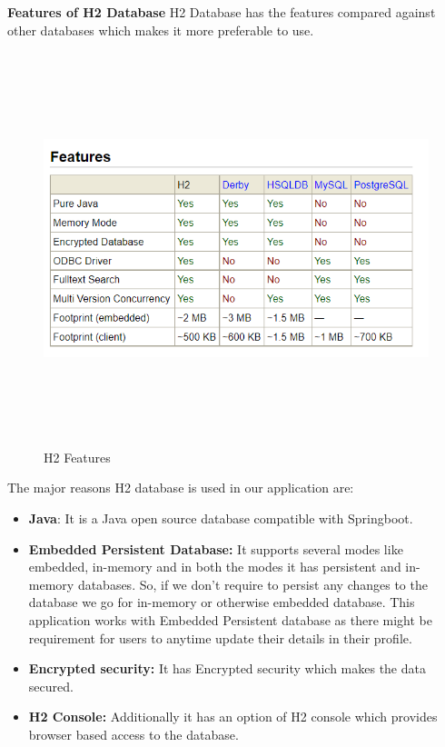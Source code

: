 \begin{enumerate}
    \textbf{Features of H2 Database}\newline
    H2 Database has the features compared against other databases which makes it more preferable to use.
     \begin{figure}[h!]
    \begin{center}
   \includegraphics[scale=0.7,width=7in,height=4.5in]{images/h2features.PNG}
   \centering \caption{H2 Features}
    \end{center}
    \end{figure}
    The major reasons H2 database is used in our application are:
    \begin{itemize}
        \item \textbf{Java}: It is a Java open source database compatible with Springboot.
        \item \textbf{Embedded Persistent Database:} It supports several modes like embedded, in-memory and in both the modes it has persistent and in-memory databases. So, if we don't require to persist any changes to the database we go for in-memory or otherwise embedded database.
        This application works with Embedded Persistent database as there might be requirement for users to anytime update their details in their profile.
        \item \textbf{Encrypted security:} It has Encrypted security which makes the data secured.
        \item \textbf{H2 Console:} Additionally it has an option of H2 console which provides browser based access to the database.
    \end{itemize}   
    

\end{enumerate}

